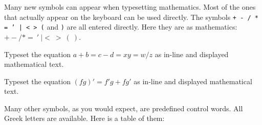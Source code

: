 Many new symbols can appear when typesetting mathematics.  Most 
of the ones that actually appear on the keyboard can be used 
directly. The symbols {\tt + - / * = ' | < > (} and {\tt )} are 
all entered directly. Here they are as mathematics: $+ - / * =\> 
'\> | <\> >\> ( \> )$. 
 
\exercise Typeset the equation $a+b=c-d=xy=w/z$ as in-line and 
displayed mathematical text. 
 
\exercise Typeset the equation $(fg)' = f'g + fg'$ as in-line and 
displayed mathematical text. 
\bigskip 
 
Many other symbols, as you would expect, are predefined control 
words.  All Greek letters are available.  Here is a table of them: 
 
 
